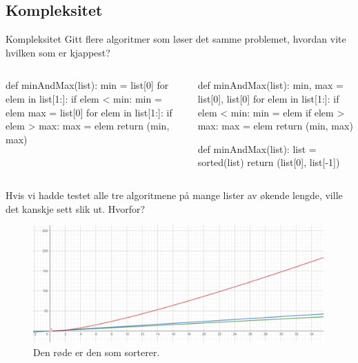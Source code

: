 \subsection{Kompleksitet}
\begin{frame}[fragile]{Kompleksitet}
    Gitt flere algoritmer som løser det samme problemet, hvordan vite hvilken som er kjappest?
    \begin{columns}
        \begin{column}{0.45\textwidth}
            \begin{python}
def minAndMax(list):
    min = list[0]
    for elem in list[1:]:
        if elem < min:
            min = elem
    max = list[0]
    for elem in list[1:]:
        if elem > max:
            max = elem
    return (min, max)
            \end{python}
        \end{column}
        \pause
        \begin{column}{0.45\textwidth}
            \begin{python}
def minAndMax(list):
    min, max = list[0], list[0]
    for elem in list[1:]:
        if elem < min: min = elem
        if elem > max: max = elem
    return (min, max)
    
def minAndMax(list):
    list = sorted(list)
    return (list[0], list[-1])
            \end{python}
        \end{column}
    \end{columns}    
\end{frame}
\begin{frame}[fragile]{}
    Hvis vi hadde testet alle tre algoritmene på mange lister av økende lengde, ville det kanskje sett slik ut. Hvorfor?
    \begin{figure}
        \centering
        \includegraphics[height = 4.5cm]{images/minmax.png}
        \caption{Den røde er den som sorterer.}
        \label{fig:minmax}
    \end{figure}    
\end{frame}

